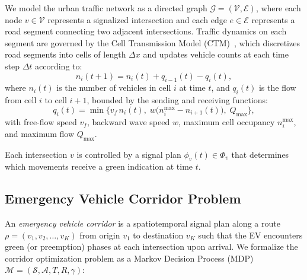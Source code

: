 \documentclass[journal]{IEEEtran}
\begin{document}
We model the urban traffic network as a directed graph
$\mathcal{G} = (\mathcal{V}, \mathcal{E})$, where each node
$v \in \mathcal{V}$ represents a signalized intersection and each
edge $e \in \mathcal{E}$ represents a road segment connecting two
adjacent intersections.  Traffic dynamics on each segment are governed
by the Cell Transmission Model (CTM)~\cite{daganzo1994cell,
daganzo1995cell}, which discretizes road segments into cells of length
$\Delta x$ and updates vehicle counts at each time step $\Delta t$
according to:
\begin{equation}
  n_i(t+1) = n_i(t) + q_{i-1}(t) - q_i(t),
  \label{eq:ctm}
\end{equation}
where $n_i(t)$ is the number of vehicles in cell $i$ at time $t$, and
$q_i(t)$ is the flow from cell $i$ to cell $i+1$, bounded by the
sending and receiving functions:
\begin{equation}
  q_i(t) = \min\!\bigl\{
    v_f \, n_i(t),\;
    w \bigl(n_i^{\max} - n_{i+1}(t)\bigr),\;
    Q_{\max}
  \bigr\},
  \label{eq:ctm_flow}
\end{equation}
with free-flow speed $v_f$, backward wave speed $w$, maximum cell
occupancy $n_i^{\max}$, and maximum flow $Q_{\max}$.

Each intersection $v$ is controlled by a signal plan
$\phi_v(t) \in \Phi_v$ that determines which movements receive a green
indication at time $t$.

\subsection{Emergency Vehicle Corridor Problem}
\label{sec:formulation:ev}

An \emph{emergency vehicle corridor} is a spatiotemporal signal plan
along a route $\rho = (v_1, v_2, \ldots, v_K)$ from origin $v_1$ to
destination $v_K$ such that the EV encounters green (or preemption)
phases at each intersection upon arrival.  We formalize the corridor
optimization problem as a Markov Decision Process (MDP)
$\mathcal{M} = (\mathcal{S}, \mathcal{A}, T, R, \gamma)$:
\end{document}

